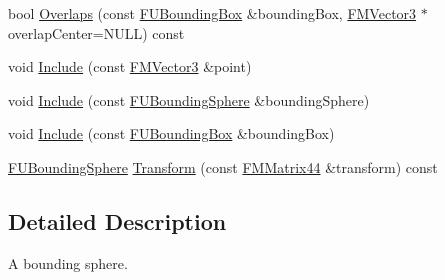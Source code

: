 \begin{DoxyCompactItemize}
\item 
bool \hyperlink{classFUBoundingSphere_abbfabd998defd4a3f8ec6a2570476b9b}{Overlaps} (const \hyperlink{classFUBoundingBox}{FUBoundingBox} \&boundingBox, \hyperlink{classFMVector3}{FMVector3} $\ast$overlapCenter=NULL) const 
\item 
void \hyperlink{classFUBoundingSphere_a9204f9a5b8784ad8e1c70fbcbe5b30bb}{Include} (const \hyperlink{classFMVector3}{FMVector3} \&point)
\item 
void \hyperlink{classFUBoundingSphere_aeedee8e04214d5389bc61fbf4167dd26}{Include} (const \hyperlink{classFUBoundingSphere}{FUBoundingSphere} \&boundingSphere)
\item 
void \hyperlink{classFUBoundingSphere_a1bf453ac6fbca95bcaff8fa6e700a9a3}{Include} (const \hyperlink{classFUBoundingBox}{FUBoundingBox} \&boundingBox)
\item 
\hyperlink{classFUBoundingSphere}{FUBoundingSphere} \hyperlink{classFUBoundingSphere_aafd37f8aaca9a64b02f5c8c6f8cc77f4}{Transform} (const \hyperlink{classFMMatrix44}{FMMatrix44} \&transform) const 
\end{DoxyCompactItemize}


\subsection{Detailed Description}
A bounding sphere. 

